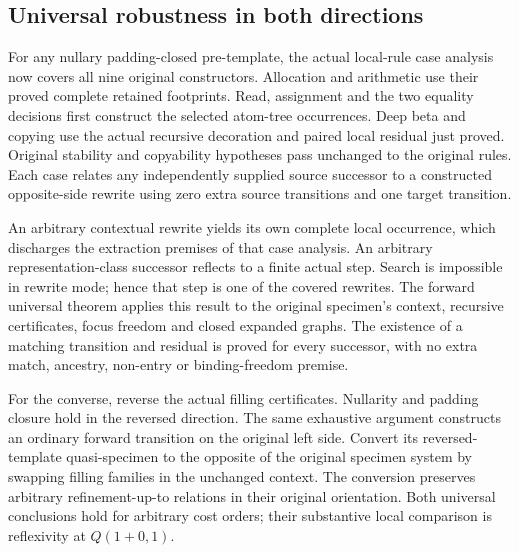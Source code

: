 \subsection{Universal robustness in both directions}
For any nullary padding-closed pre-template, the actual local-rule case
analysis now covers all nine original constructors. Allocation and arithmetic
use their proved complete retained footprints. Read, assignment and the two
equality decisions first construct the selected atom-tree occurrences.
Deep beta and copying use the actual recursive decoration and paired local
residual just proved. Original stability and copyability hypotheses pass
unchanged to the original rules. Each case relates any independently
supplied source successor to a constructed opposite-side rewrite using zero
extra source transitions and one target transition.

An arbitrary contextual rewrite yields its own complete local occurrence,
which discharges the extraction premises of that case analysis. An arbitrary
representation-class successor reflects to a finite actual step. Search is
impossible in rewrite mode; hence that step is one of the covered rewrites.
The forward universal theorem applies this result to the original specimen's
context, recursive certificates, focus freedom and closed expanded graphs.
The existence of a matching transition and residual is proved for every
successor, with no extra match, ancestry, non-entry or binding-freedom premise.

For the converse, reverse the actual filling certificates. Nullarity and
padding closure hold in the reversed direction. The same exhaustive argument
constructs an ordinary forward transition on the original left side.
Convert its reversed-template quasi-specimen to the opposite of the original
specimen system by swapping filling families in the unchanged context. The
conversion preserves arbitrary refinement-up-to relations in their original
orientation. Both universal conclusions hold for arbitrary cost orders;
their substantive local comparison is reflexivity at $Q(1+0,1)$.
